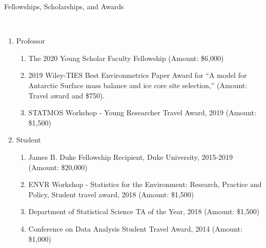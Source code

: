 \documentclass[12pt]{article}
\newcommand{\head}[1]{ %
    \bigskip %
    \begin{large}\begin{bf}{#1}\end{bf}\end{large} %

    \ \\ [-1.3cm] %

    \hrulefill}
\begin{document}
\head{Fellowships, Scholarships, and Awards}
\begin{enumerate}[label=$\bullet$]

\item Professor
\begin{enumerate}[label=$\cdot$]
\item The 2020 Young Scholar Faculty Fellowship (Amount: \$6,000)
\item 2019 Wiley-TIES Best Environmetrics Paper Award for ``A model for Antarctic Surface mass balance and ice core site selection,''  (Amount: Travel award and \$750).
\item STATMOS Workshop - Young Researcher Travel Award, 2019  (Amount: \$1,500)
\end{enumerate}
\item Student
\begin{enumerate}[label=$\cdot$]
\item James B. Duke Fellowship Recipient, Duke University, 2015-2019 (Amount: \$20,000)
\item ENVR Workshop - Statistics for the Environment: Research, Practice and Policy, Student travel award, 2018 (Amount: \$1,500)
\item Department of Statistical Science TA of the Year, 2018 (Amount: \$1,500)
\item Conference on Data Analysis Student Travel Award, 2014 (Amount: \$1,000)
\end{enumerate}

\end{enumerate}
\end{document}
